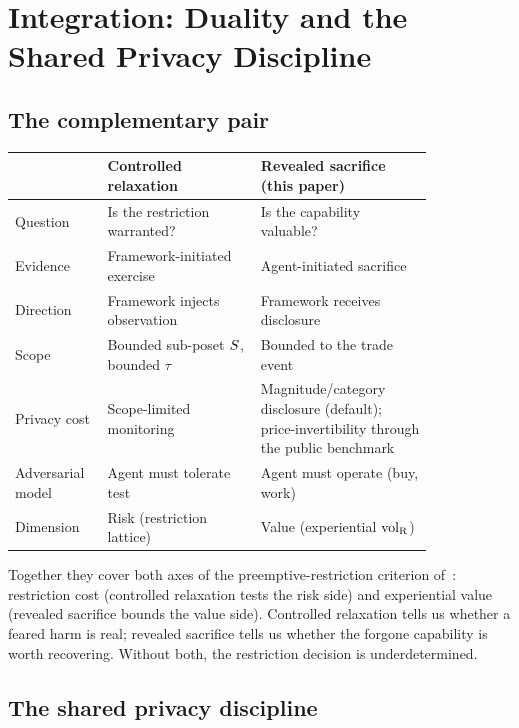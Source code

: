 \section{Integration: Duality and the Shared Privacy Discipline}
\label{sec:integration}

\subsection{The complementary pair}

\begin{center}
\small
\begin{tabular}{@{}>{\raggedright\arraybackslash}p{0.15\linewidth}
                  >{\raggedright\arraybackslash}p{0.32\linewidth}
                  >{\raggedright\arraybackslash}p{0.36\linewidth}@{}}
\toprule
& \textbf{Controlled relaxation}~\citep[Controlled~Relaxation]{lasser2026wamura}
& \textbf{Revealed sacrifice} (this paper) \\
\midrule
Question & Is the restriction warranted?
& Is the capability valuable? \\
Evidence & Framework-initiated exercise
& Agent-initiated sacrifice \\
Direction & Framework injects observation
& Framework receives disclosure \\
Scope & Bounded sub-poset $S$, bounded $\tau$
& Bounded to the trade event \\
Privacy cost & Scope-limited monitoring
& Magnitude/category disclosure (default); price-invertibility
through the public benchmark \\
Adversarial model & Agent must tolerate test
& Agent must operate (buy, work) \\
Dimension & Risk (restriction lattice)
& Value (experiential ${\operatorname{vol}_{\mathrm{R}}}$) \\
\bottomrule
\end{tabular}
\end{center}

Together they cover both axes of the preemptive-restriction
criterion of~\citep[Proposition~1]{lasser2026horizon}:
restriction cost (controlled relaxation tests the risk side)
and experiential value (revealed sacrifice bounds the value
side).  Controlled relaxation tells us whether a feared harm is
real; revealed sacrifice tells us whether the forgone capability
is worth recovering.  Without both, the restriction decision is
underdetermined.

\subsection{The shared privacy discipline}

